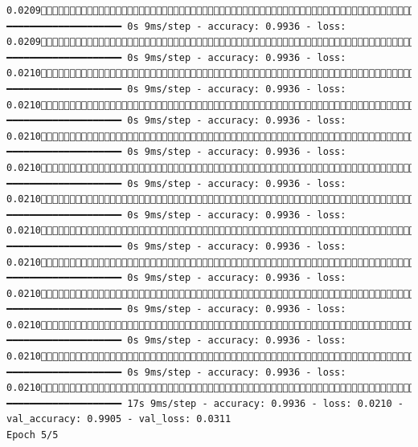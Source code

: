 \documentclass[
  letterpaper,
  DIV=11,
  numbers=noendperiod]{scrreprt}
\begin{document}
\begin{verbatim}
0.02091790/1875 ━━━━━━━━━━━━━━━━━━━━ 0s 9ms/step - accuracy: 0.9936 - loss: 0.02091798/1875 ━━━━━━━━━━━━━━━━━━━━ 0s 9ms/step - accuracy: 0.9936 - loss: 0.02101805/1875 ━━━━━━━━━━━━━━━━━━━━ 0s 9ms/step - accuracy: 0.9936 - loss: 0.02101813/1875 ━━━━━━━━━━━━━━━━━━━━ 0s 9ms/step - accuracy: 0.9936 - loss: 0.02101820/1875 ━━━━━━━━━━━━━━━━━━━━ 0s 9ms/step - accuracy: 0.9936 - loss: 0.02101828/1875 ━━━━━━━━━━━━━━━━━━━━ 0s 9ms/step - accuracy: 0.9936 - loss: 0.02101836/1875 ━━━━━━━━━━━━━━━━━━━━ 0s 9ms/step - accuracy: 0.9936 - loss: 0.02101843/1875 ━━━━━━━━━━━━━━━━━━━━ 0s 9ms/step - accuracy: 0.9936 - loss: 0.02101851/1875 ━━━━━━━━━━━━━━━━━━━━ 0s 9ms/step - accuracy: 0.9936 - loss: 0.02101857/1875 ━━━━━━━━━━━━━━━━━━━━ 0s 9ms/step - accuracy: 0.9936 - loss: 0.02101864/1875 ━━━━━━━━━━━━━━━━━━━━ 0s 9ms/step - accuracy: 0.9936 - loss: 0.02101871/1875 ━━━━━━━━━━━━━━━━━━━━ 0s 9ms/step - accuracy: 0.9936 - loss: 0.02101875/1875 ━━━━━━━━━━━━━━━━━━━━ 17s 9ms/step - accuracy: 0.9936 - loss: 0.0210 - val_accuracy: 0.9905 - val_loss: 0.0311
Epoch 5/5

\end{verbatim}
\end{document}
